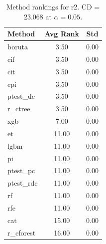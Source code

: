 \begin{table}[h]
\centering
\caption{Method rankings for r2. CD = 23.068 at $\alpha=0.05$.}
\label{tab:ranks_r2}
\begin{tabular}{lcc}
\toprule
Method & Avg Rank & Std \\
\midrule
boruta & 3.50 & 0.00 \\
cif & 3.50 & 0.00 \\
cit & 3.50 & 0.00 \\
cpi & 3.50 & 0.00 \\
ptest_dc & 3.50 & 0.00 \\
r_ctree & 3.50 & 0.00 \\
xgb & 7.00 & 0.00 \\
et & 11.00 & 0.00 \\
lgbm & 11.00 & 0.00 \\
pi & 11.00 & 0.00 \\
ptest_pc & 11.00 & 0.00 \\
ptest_rdc & 11.00 & 0.00 \\
rf & 11.00 & 0.00 \\
rfe & 11.00 & 0.00 \\
cat & 15.00 & 0.00 \\
r_cforest & 16.00 & 0.00 \\
\bottomrule
\end{tabular}
\end{table}